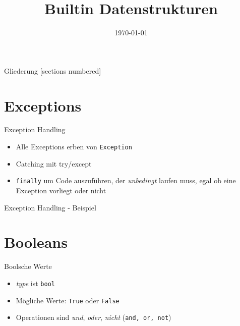 



\title{Builtin Datenstrukturen}
\date{\today}




\maketitle

\begin{frame}{Gliederung}
	[sections numbered]
	\tableofcontents
\end{frame}


\section{Exceptions}

\begin{frame}{Exception Handling}
	\begin{itemize}
		\item Alle Exceptions erben von \alert{\texttt{Exception}}
		\item Catching mit try/except
		\item \alert{\texttt{finally}} um Code auszuführen, der \textit{unbedingt} laufen muss, egal ob eine Exception vorliegt oder nicht
	\end{itemize}
\end{frame}

\begin{frame}{Exception Handling - Beispiel}
    
\end{frame}


\section{Booleans}

\begin{frame}{Boolsche Werte}
	\begin{itemize}
		\item \textit{type} ist \alert{\texttt{bool}}
		\item Mögliche Werte: \texttt{True} oder \texttt{False}
		\item Operationen sind \textit{und}, \textit{oder}, \textit{nicht} (\texttt{and, or, not})
	\end{itemize}
\end{frame}


